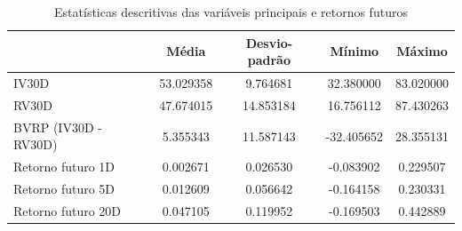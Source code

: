\begin{table}[H]
\centering
\caption{Estatísticas descritivas das variáveis principais e retornos futuros}
\label{tab:estatisticas_cap3}
\begin{tabular}{lcccc}
\toprule
 & Média & Desvio-padrão & Mínimo & Máximo \\
\midrule
IV30D & 53.029358 & 9.764681 & 32.380000 & 83.020000 \\
RV30D & 47.674015 & 14.853184 & 16.756112 & 87.430263 \\
BVRP (IV30D - RV30D) & 5.355343 & 11.587143 & -32.405652 & 28.355131 \\
Retorno futuro 1D & 0.002671 & 0.026530 & -0.083902 & 0.229507 \\
Retorno futuro 5D & 0.012609 & 0.056642 & -0.164158 & 0.230331 \\
Retorno futuro 20D & 0.047105 & 0.119952 & -0.169503 & 0.442889 \\
\bottomrule
\end{tabular}
\end{table}

